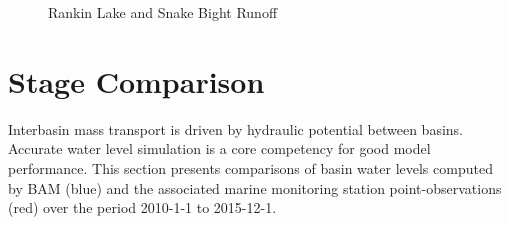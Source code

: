 \begin{figure}[H]
  \caption{Rankin Lake and Snake Bight Runoff}
  \label{fig:Rankin Lake and Snake Bight Runoff}
\end{figure}

\clearpage 
\section{Stage Comparison}
\label{sec:Stage Comparison}
Interbasin mass transport is driven by hydraulic potential between basins.  Accurate water level simulation is a core competency for good model performance.  This section presents comparisons of basin water levels computed by BAM (blue) and the associated marine monitoring station point-observations (red) over the period 2010-1-1 to 2015-12-1.


